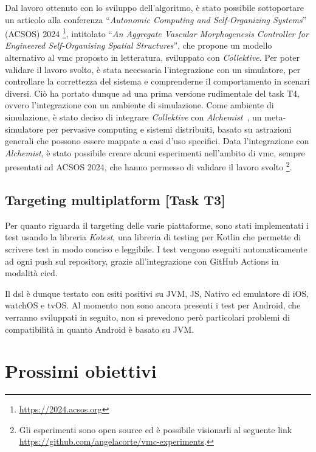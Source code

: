 \documentclass[13pt, a4paper]{scrartcl}
\newcommand{\ck}{\emph{Collektive}}
\begin{document}
Dal lavoro ottenuto con lo sviluppo dell'algoritmo,
    è stato possibile sottoportare un articolo alla conferenza ``\emph{Autonomic Computing and Self-Organizing Systems}'' (ACSOS) 2024
    \footnote{\url{https://2024.acsos.org}},
    intitolato ``\emph{An Aggregate Vascular Morphogenesis Controller for Engineered Self-Organising Spatial Structures}'',
    che propone un modello alternativo al \ac{vmc} proposto in letteratura,
    sviluppato con \ck{}.
%
Per poter validare il lavoro svolto, è stata necessaria l'integrazione con un simulatore,
    per controllare la correttezza del sistema e comprenderne il comportamento in scenari diversi.
%
Ciò ha portato dunque ad una prima versione rudimentale del task T4, ovvero l'integrazione con un ambiente di simulazione.
%
Come ambiente di simulazione, è stato deciso di integrare \ck{} con \emph{Alchemist}~\cite{PianiniJOS2013},
    un meta-simulatore per pervasive computing e sistemi distribuiti,
    basato su astrazioni generali che possono essere mappate a casi d'uso specifici.
%
Data l'integrazione con \emph{Alchemist}, è stato possibile creare alcuni esperimenti nell'ambito di \ac{vmc},
    sempre presentati ad ACSOS 2024, che hanno permesso di validare il lavoro svolto \footnote{
    Gli esperimenti sono open source ed è possibile visionarli al seguente link \url{https://github.com/angelacorte/vmc-experiments}.
}.

\subsection{Targeting multiplatform [Task T3]}\label{subsec:task-t3-[targeting-multiplatform]}
Per quanto riguarda il targeting delle varie piattaforme,
    sono stati implementati i test usando la libreria \emph{Kotest},
    una libreria di testing per Kotlin che permette di scrivere test in modo conciso e leggibile.
%
I test vengono eseguiti automaticamente ad ogni push sul repository, grazie all'integrazione con GitHub Actions in modalità \ac{cicd}.

Il \ac{dsl} è dunque testato con esiti positivi su JVM, JS, Nativo ed emulatore di iOS, watchOS e tvOS.
%
Al momento non sono ancora presenti i test per Android, che verranno sviluppati in seguito,
    non si prevedono però particolari problemi di compatibilità in quanto Android è basato su JVM.

\section{Prossimi obiettivi}\label{sec:prossimi-obiettivi}
\end{document}

